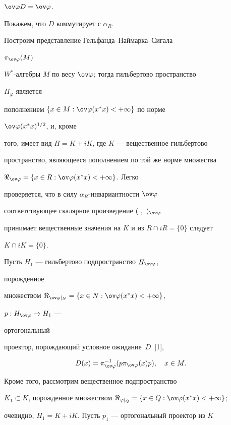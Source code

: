 \begin{pf}
$\ov\varphi{}D=\ov\varphi$. 


Покажем, что $D$ коммутирует с $\alpha_R$. 


 


Построим представление Гельфанда--Наймарка--Сигала 


$\pi_{\ov\varphi}(M)$\; 


$W^*$-алгебры $M$ по весу $\ov\varphi$; тогда гильбертово пространство 


$H_\varphi$ является 


пополнением $\{x\in M:\ov\varphi(x^*x)<+\infty\}$ по норме 


$\ov\varphi(x^*x)^{1/2}$, и, кроме 


того, имеет вид $H=K+i{}K$, где $K$ --- вещественное гильбертово 


пространство, являющееся пополнением по той же норме множества 


$\Re_{\ov\varphi}=\{x\in R:\ov\varphi(x^*x)<+\infty\}$. Легко 


проверяется, что в силу $\alpha_R$-инвариантности $\ov\varphi$ 


соответствующее скалярное произведение $(\ ,\ )_{\ov\varphi}$ 


принимает вещественные значения на $K$ и из $R\cap iR=\{0\}$ следует 


$K\cap i{}K=\{0\}$. 


 


Пусть $H_1$ --- гильбертово подпространство $H_{\ov\varphi}$, 


порожденное 


множеством $\Re_{\ov\varphi|_N}=\{x\in N:\ov\varphi(x^*x)<+\infty\}$, 


$p:H_{\ov\varphi}\to H_1$ --- 


ортогональный 


проектор, порождающий условное ожидание~$D$~[1], 


$$ 


D(x)=\pi^{-1}_{\ov\varphi}(p\pi_{\ov\varphi}(x)p),\quad x\in M. 


$$ 


Кроме того, рассмотрим вещественное подпространство 


$K_1\subset K$, порожденное множеством $\Re_{\varphi|_Q}=\{x\in 


Q:\ov\varphi(x^*x)<+\infty\}$; 


очевидно, $H_1=K+i{}K$. Пусть $p_1$ --- ортогональный проектор из $K$ 



\end{pf}
